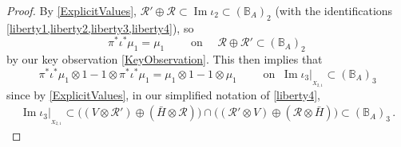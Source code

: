 \documentclass[11pt]{amsart}
\numberwithin{equation}{section}
\DeclareMathOperator{\ima}{Im}
\newcommand{\R}{\mathcal{R}}
\newcommand{\BB}{\mathbb{B}} %
\renewcommand{\_}[1]{\mbox{$_{\left( #1 \right)}$}}
\newcommand{\ot}{\otimes}
\begin{document}
{\begin{proof}
By \cref{ExplicitValues},
$\R'\oplus \R\subset\ima\iota_2\subset (\BB_A)_2$
(with the identifications 
\cref{liberty1,liberty2,liberty3,liberty4}), so
$$\pi^*\iota^*\mu_1 = \mu_1
\qquad\text{ on }\quad
\R\oplus \R'\subset (\BB_A)_2
\, 
$$
by our key observation \cref{KeyObservation}.
This then implies that
\begin{equation}\label{simplermu}
  \pi^*\iota^*\mu_1\ot 1 -  1\ot \pi^*\iota^*\mu_1
  = \mu_1\ot 1-1\ot \mu_1
  \qquad\text{ on }\ \ima\iota_3\big|_{_{X_{2,1}}}\subset (\BB_A)_3
\end{equation}
since by \cref{ExplicitValues},
in our simplified notation of \cref{liberty4}, 
\begin{equation}\label{subset}
  \begin{aligned}
    \ima \iota_3\big|_{_{X_{2,1}}}
    \subset
   \big( (V\ot \R')\oplus (\bar H\ot \R) \big) 
  \cap 
  \big( (\R' \ot V)\oplus (\R\ot \bar H ) \big)
  \subset (\BB_A)_3
  \, .
\end{aligned}
\end{equation}



\end{proof}}
\end{document}
